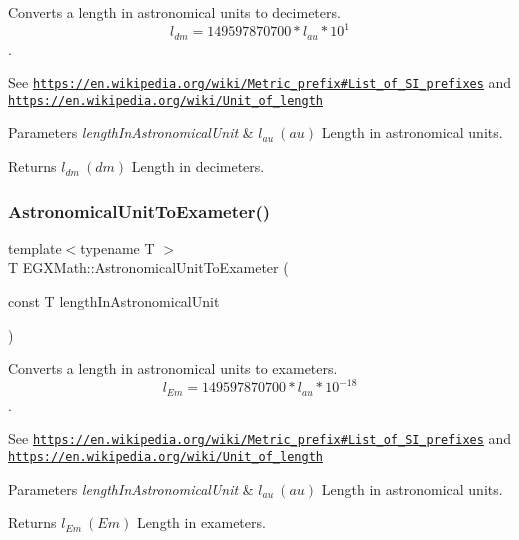 Converts a length in astronomical units to decimeters. \[ l_{dm}=149597870700 * l_{au} * 10^{1} \]. 

See \href{https://en.wikipedia.org/wiki/Metric_prefix#List_of_SI_prefixes}{\tt https\+://en.\+wikipedia.\+org/wiki/\+Metric\+\_\+prefix\#\+List\+\_\+of\+\_\+\+S\+I\+\_\+prefixes} and \href{https://en.wikipedia.org/wiki/Unit_of_length}{\tt https\+://en.\+wikipedia.\+org/wiki/\+Unit\+\_\+of\+\_\+length} 
\begin{DoxyParams}{Parameters}
{\em length\+In\+Astronomical\+Unit} & $ l_{au}\ (au)$ Length in astronomical units. \\
\hline
\end{DoxyParams}
\begin{DoxyReturn}{Returns}
$ l_{dm}\ (dm)$ Length in decimeters. 
\end{DoxyReturn}
\mbox{\label{group___e_g_x_math-_conversions-_length_conversions-_astronomical-_astronomical_unit-_s_i_ga393f3407128b5b84500a5c16796ebed4}} 
\subsubsection{\texorpdfstring{Astronomical\+Unit\+To\+Exameter()}{AstronomicalUnitToExameter()}}
{\footnotesize\ttfamily template$<$typename T $>$ \\
T E\+G\+X\+Math\+::\+Astronomical\+Unit\+To\+Exameter (\begin{DoxyParamCaption}\item[{const T}]{length\+In\+Astronomical\+Unit }\end{DoxyParamCaption})}



Converts a length in astronomical units to exameters. \[ l_{Em}=149597870700 * l_{au} * 10^{-18} \]. 

See \href{https://en.wikipedia.org/wiki/Metric_prefix#List_of_SI_prefixes}{\tt https\+://en.\+wikipedia.\+org/wiki/\+Metric\+\_\+prefix\#\+List\+\_\+of\+\_\+\+S\+I\+\_\+prefixes} and \href{https://en.wikipedia.org/wiki/Unit_of_length}{\tt https\+://en.\+wikipedia.\+org/wiki/\+Unit\+\_\+of\+\_\+length} 
\begin{DoxyParams}{Parameters}
{\em length\+In\+Astronomical\+Unit} & $ l_{au}\ (au)$ Length in astronomical units. \\
\hline
\end{DoxyParams}
\begin{DoxyReturn}{Returns}
$ l_{Em}\ (Em)$ Length in exameters. 
\end{DoxyReturn}
\mbox{\label{group___e_g_x_math-_conversions-_length_conversions-_astronomical-_astronomical_unit-_s_i_gaa39df97fbf96f7e68369e60f34351234}} 
